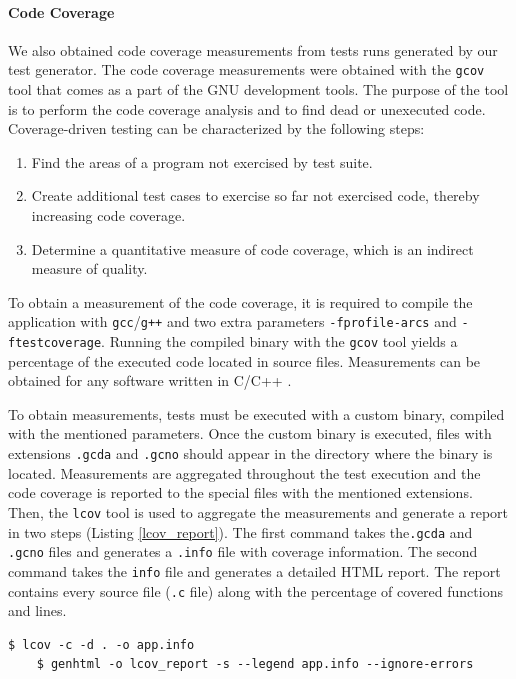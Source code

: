 \paragraph{Code Coverage} We also obtained code coverage measurements from tests runs generated by our test generator. The code coverage measurements were obtained with the \verb|gcov| tool that comes as a part of the GNU development tools. The purpose of the tool is to perform the code coverage analysis and to find dead or unexecuted code. Coverage-driven testing can be characterized by the following steps: 
\begin{enumerate}
  \item Find the areas of a program not exercised by test suite.
  \item Create additional test cases to exercise so far not exercised code, thereby increasing code coverage.
  \item Determine a quantitative measure of code coverage, which is an indirect measure of quality.
\end{enumerate}

To obtain a measurement of the code coverage, it is required to compile the application with \verb|gcc|/\verb|g++| and two extra parameters \verb|-fprofile-arcs| and \verb|-ftestcoverage|. Running the compiled binary with the \verb|gcov| tool yields a percentage of the executed code located in source files. Measurements can be obtained for any software written in C/C++ \cite{gcov}.

To obtain measurements, tests must be executed with a custom binary, compiled with the mentioned parameters. Once the custom binary is executed, files with extensions \texttt{.gcda} and \texttt{.gcno} should appear in the directory where the binary is located. Measurements are aggregated throughout the test execution and the code coverage is reported to the special files with the mentioned extensions. Then, the \texttt{lcov} tool is used to aggregate the measurements and generate a report in two steps (Listing \ref{lcov_report}). The first command takes the\texttt{.gcda} and \texttt{.gcno} files and generates a \texttt{.info} file with coverage information. The second command takes the \texttt{info} file and generates a detailed HTML report. The report contains every source file (\texttt{.c} file) along with the percentage of covered functions and lines.

\begin{lstlisting}[language=Gherkin,caption={Shell commands used to generate an HTML report with the \texttt{lcov} tool},label={lcov_report}]
    $ lcov -c -d . -o app.info
    $ genhtml -o lcov_report -s --legend app.info --ignore-errors
\end{lstlisting}


